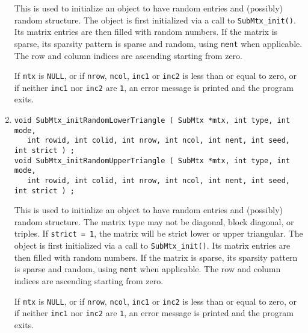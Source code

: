 \begin{enumerate}
This is used to initialize an object to have random entries
and (possibly) random structure.
The object is first initialized via a call to {\tt SubMtx\_init()}.
Its matrix entries are then filled with random numbers.
If the matrix is sparse, its sparsity pattern is sparse and random, 
using {\tt nent} when applicable.
The row and column indices are ascending starting from zero.
\par {}
If {\tt mtx} is {\tt NULL},
or if {\tt nrow}, {\tt ncol}, {\tt inc1} or {\tt inc2}
is less than or equal to zero,
or if neither {\tt inc1} nor {\tt inc2} are {\tt 1},
an error message is printed and the program exits.
\item
\begin{verbatim}
void SubMtx_initRandomLowerTriangle ( SubMtx *mtx, int type, int mode, 
   int rowid, int colid, int nrow, int ncol, int nent, int seed, int strict ) ;
void SubMtx_initRandomUpperTriangle ( SubMtx *mtx, int type, int mode,
   int rowid, int colid, int nrow, int ncol, int nent, int seed, int strict ) ;
\end{verbatim}
This is used to initialize an object to have random entries
and (possibly) random structure.
The matrix type may not be diagonal, block diagonal, or triples.
If {\tt strict = 1}, the matrix will be strict lower or upper
triangular.
The object is first initialized via a call to {\tt SubMtx\_init()}.
Its matrix entries are then filled with random numbers.
If the matrix is sparse, its sparsity pattern is sparse and random, 
using {\tt nent} when applicable.
The row and column indices are ascending starting from zero.
\par {}
If {\tt mtx} is {\tt NULL},
or if {\tt nrow}, {\tt ncol}, {\tt inc1} or {\tt inc2}
is less than or equal to zero,
or if neither {\tt inc1} nor {\tt inc2} are {\tt 1},
an error message is printed and the program exits.
\end{enumerate}
\par
